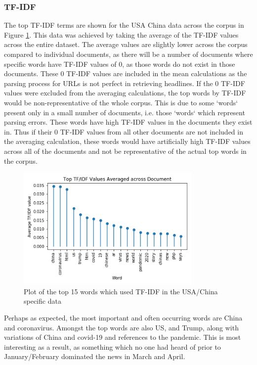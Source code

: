 \subsubsection{TF-IDF}
The top TF-IDF terms are shown for the USA China data across the corpus in Figure \ref{fig:tfidfusachina}. This data was achieved by taking the average of the TF-IDF values across the entire dataset. The average values are slightly lower across the corpus compared to individual documents, as there will be a number of documents where specific words have TF-IDF values of 0, as those words do not exist in those documents. These 0 TF-IDF values are included in the mean calculations as the parsing process for URLs is not perfect in retrieving headlines. If the 0 TF-IDF values were excluded from the averaging calculations, the top words by TF-IDF would be non-representative of the whole corpus. This is due to some `words` present only in a small number of documents, i.e. those `words` which represent parsing errors. These words have high TF-IDF values in the documents they exist in. Thus if their 0 TF-IDF values from all other documents are not included in the averaging calculation, these words would have artificially high TF-IDF values across all of the documents and not be representative of the actual top words in the corpus.

\begin{figure}[H]
	\centering
	\includegraphics[width=0.8\textwidth]{Images/usa_stem_tfidf.png}
	\caption{Plot of the top 15 words which used TF-IDF in the USA/China specific data}
	\label{fig:tfidfusachina}
\end{figure}

Perhaps as expected, the most important and often occurring words are China and coronavirus.  Amongst the top words are also US, and Trump, along with variations of China and covid-19 and references to the pandemic. This is most interesting as a result, as something which no one had heard of prior to January/February dominated the news in March and April.

